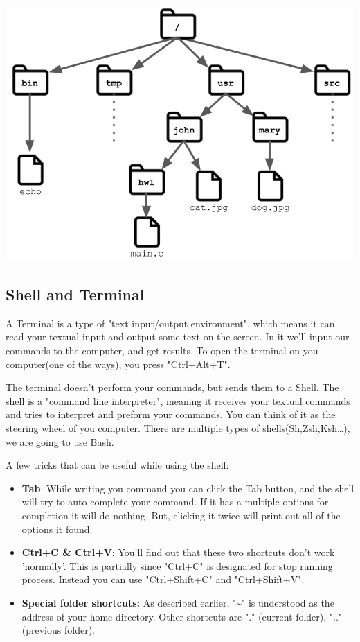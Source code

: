 \documentclass[11pt]{article}
\begin{document}
\begin{center}
	\includegraphics[scale=0.3]{file_tree.png}
\end{center}
\subsection{Shell and Terminal}
A Terminal is a type of "text input/output environment", which means it can read your textual input and output some text on the screen. In it we'll input our commands to the computer, and get results.
To open the terminal on you computer(one of the ways), you press "Ctrl+Alt+T". 

\noindent The terminal doesn't perform your commands, but sends them to a Shell. The shell is a "command line interpreter", meaning it receives your textual commands and tries to interpret and preform your commands. You can think of it as the steering wheel of you computer. There are multiple types of shells(Sh,Zsh,Ksh\ldots), we are going to use Bash. 

A few tricks that can be useful while using the shell:
\smallskip
\begin{itemize}
	\item {\bf Tab}: While writing you command you can click the Tab button, and the shell will try to auto-complete your command. If it has a multiple options for completion it will do nothing. But, clicking it twice will print out all of the options it found.
	\item {\bf Ctrl+C \& Ctrl+V}: You'll find out that these two shortcuts don't work 'normally'. This is partially since "Ctrl+C" is designated for stop running process. Instead you can use "Ctrl+Shift+C" and "Ctrl+Shift+V".
	\item {\bf Special folder shortcuts:} As described earlier, "\textasciitilde" is understood as the address of your home directory. Other shortcuts are "." (current folder), ".." (previous folder).
	
\end{itemize}
\end{document}
